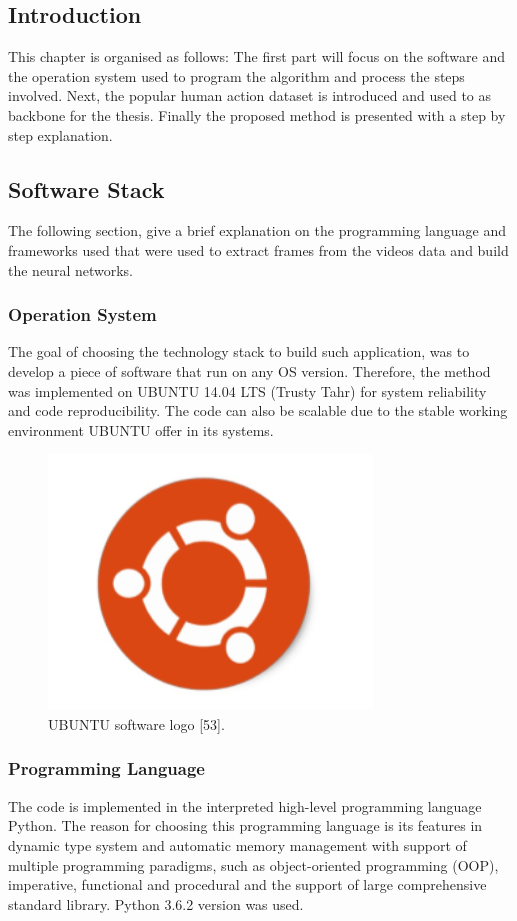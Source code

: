 \subsection{Introduction}
\hspace{5mm} This chapter is organised as follows: The first part will focus on the software and the operation system used to program the algorithm and process the steps involved. Next, the popular human action dataset is introduced and used to as backbone for the thesis. Finally the proposed method is presented with a step by step explanation.
\subsection{Software Stack}
\hspace{5mm} The following section, give a brief explanation on the programming language and frameworks used that were used to extract frames from the videos data and build the neural networks.
\subsubsection{Operation System}
\hspace{5mm} The goal of choosing the technology stack to build such application, was to develop a piece of software that run on any OS version. Therefore, the method was implemented on UBUNTU 14.04 LTS (Trusty Tahr) for system reliability and code reproducibility. The code can also be scalable due to the stable working environment UBUNTU offer in its systems.
\begin{figure}[ht]
\centering
\includegraphics{Figures/u}
\decoRule
\caption[UBUNTU software logo "53".]{UBUNTU software logo [53].}
\label{fig:la}
\end{figure}

\subsubsection{Programming Language}
\hspace{5mm} The code is implemented in the interpreted high-level programming language Python. The reason for choosing this programming language is its features in dynamic type system and automatic memory management with support of multiple programming paradigms, such as object-oriented programming (OOP), imperative, functional and procedural and the support of large comprehensive standard library.
Python 3.6.2 version was used.

